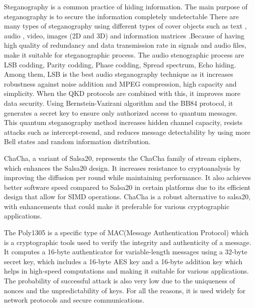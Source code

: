 \documentclass[12pt]{article}
\begin{document}
Steganography is a common practice of hiding information. The main purpose of steganography is to secure the information completely undetectable\cite{amin2003information} There are many types of steganography using different types of cover objects such as text \cite{yang2018rnn}, audio \cite{jayaram2011information}\cite{hemeida2021comparative}\cite{djebbar2012comparative}, video, images (2D and 3D) \cite{farrag2020secure} and information matrices \cite{mashaly2019multiple}.Because of having high quality of redundancy and data transmission rate in signals and audio files, make it suitable for steganographic process.\cite{singh2014survey} The audio stenographic process are LSB codding, Parity codding, Phase codding, Spread spectrum, Echo hiding. Among them, LSB is the best audio steganography technique as it increases robustness against noise addition and MPEG compression, high capacity and simplicity.\cite{cvejic2004increasing}\cite{jayaram2011information}  When the QKD protocols are combined with this, it improves more data security. Using Bernstein-Vazirani algorithm and the BB84 protocol, it generates a secret key to ensure only authorized access to quantum messages. This quantum steganography method increases hidden channel capacity, resists attacks such as intercept-resend, and reduces message detectability by using more Bell states and random information distribution.\cite{yalla2022novel}

ChaCha, a variant of Salsa20, represents the ChaCha family of stream ciphers, which enhances the Salsa20 design. It increases resistance to cryptoanalysis by improving the diffusion per round while maintaining performance. It also achieves better software speed compared to Salsa20 in certain platforms due to its efficient design that allow for SIMD operations.\cite{bernstein2008chacha} ChaCha is a robust alternative to salsa20, with enhancements that could make it preferable for various cryptographic applications.

The Poly1305 is a specific type of MAC(Message Authentication Protocol) which is a cryptographic tools used to verify the integrity and authenticity of a message.\cite{bernstein2005poly1305} It computes a 16-byte authenticator for variable-length messages using a 32-byte secret key, which includes a 16-byte AES key and a 16-byte addition key which helps in high-speed computations and making it suitable for various applications.\cite{bernstein2005poly1305} The probability of successful attack is also very low due to the uniqueness of nonces and the unpredictability of keys. For all the reasons, it is used widely for network protocols and secure communications.
\end{document}

